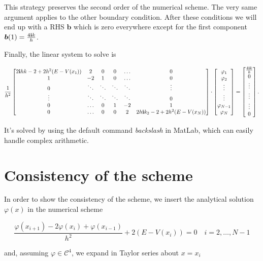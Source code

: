 \documentclass[12pt,a4paper,onecolumn]{article}
\theoremstyle{definition}
\theoremstyle{plain}
\newcommand{\var}{\varphi}
\renewcommand{\phi}{\varphi}
\begin{document}
This strategy preserves the second order of the numerical scheme. The very same argument applies to the other boundary condition. After these conditions we will end up with a RHS $\boldsymbol{b}$ which is zero everywhere except for the first component $\boldsymbol{b}(1)=\frac{ 4 \bold{i} k}{h}$.

Finally, the linear system to solve is 


\[
\frac{1}{h^2}
\begin{bmatrix}
2 \bold{i}hk-2+2h^2(E-V(x_1)) & 2 & 0 & 0 & \dots & 0 \\
1 & -2 & 1 & 0 & \dots & 0 \\
0 & \ddots & \ddots & \ddots & \ddots & \vdots \\
\vdots & \ddots & \ddots & \ddots & \ddots & 0 \\
0 & \dots & 0 & 1 & -2 & 1 \\
0 & \dots & 0 & 0 & 2 & 2 h \bold{i} k_2 - 2 +2 h^2 (E-V(x_N))
\end{bmatrix} 
\cdot
\begin{bmatrix}
\phi_1 \\
\phi_2 \\
\vdots \\
\vdots \\
\phi_{N-1} \\
\phi_N
\end{bmatrix}
=
\begin{bmatrix}
\frac{4 \bold{i}k}{h} \\
0 \\
\vdots \\
\vdots \\
\vdots \\
0
\end{bmatrix}.
\]

It's solved by using the default command \emph{backslash} in MatLab, which can easily handle complex arithmetic.


\section{Consistency of the scheme}

In order to show the consistency of the scheme, we insert the analytical solution $\var(x)$ in the numerical scheme

 \[ \frac{\var(x_{i+1})-2\var(x_i)+\var(x_{i-1})}{h^2}+2(E-V(x_i))=0 \quad i=2, \ldots, N-1 \]

and, assuming $\var \in \mathcal{C}^{4}$, we expand in Taylor series about $x=x_i$
\end{document}
